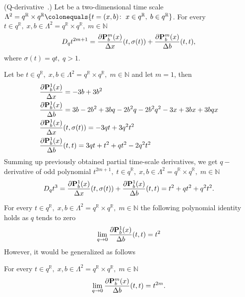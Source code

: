 \begin{cor}
    \label{q_derivative_case}
    (Q-derivative~\cite{jackson_1909}.)
    Let be a two-dimensional time scale
    $\Lambda^2 = q^{\mathbb{R}} \times q^{\mathbb{R}} \colonequals \{t=(x,b) \colon \; x\in q^{\mathbb{R}}, \; b \in q^{\mathbb{R}} \}$.
    For every $t\in q^{\mathbb{R}}, \; x,b\in \Lambda^2 = q^{\mathbb{R}} \times q^{\mathbb{R}}, \; m\in\mathbb{N}$
    \[
        D_{q} t^{2m+1}
        = \frac{\partial {\mathbf{P}}\sp{m} \sb{b}(x)}{\Delta x}(t, \sigma(t))
        + \frac{\partial {\mathbf{P}}\sp{m} \sb{b}(x)}{\Delta b}(t, t),
    \]
    where $\sigma(t) = qt, \; q > 1$.
\end{cor}
\begin{examp}
    Let be $t\in q^{\mathbb{R}}, \; x,b\in \Lambda^2 = q^{\mathbb{R}} \times q^{\mathbb{R}}, \; m\in\mathbb{N}$
    and let $m=1$, then
    \begin{align*}
        &\frac{\partial {\mathbf{P}}\sp{1} \sb{b}(x)}{\Delta x} = -3 b + 3 b^2 \\
        &\frac{\partial {\mathbf{P}}\sp{1} \sb{b}(x)}{\Delta b} = 3 b - 2 b^2 + 3 b q - 2 b^2 q - 2 b^2 q^2 - 3 x + 3 b x + 3 b q x \\
        &\frac{\partial {\mathbf{P}}\sp{1} \sb{b}(x)}{\Delta x}(t, \sigma(t)) = -3 q t + 3 q^2 t^2 \\
        &\frac{\partial {\mathbf{P}}\sp{1} \sb{b}(x)}{\Delta b}(t, t) = 3 q t + t^2 + q t^2 - 2 q^2 t^2
    \end{align*}
    Summing up previously obtained partial time-scale derivatives, we get $q-$derivative of odd polynomial
    $t^{2m+1}, \; t\in q^{\mathbb{R}}, \; x,b\in \Lambda^2 = q^{\mathbb{R}} \times q^{\mathbb{R}}, \; m\in\mathbb{N}$
    \[
        D_{q} t^{3}
        = \frac{\partial {\mathbf{P}}\sp{1} \sb{b}(x)}{\Delta x}(t, \sigma(t)) + \frac{\partial {\mathbf{P}}\sp{1} \sb{b}(x)}{\Delta b}(t, t)
        = t^2 + q t^2 + q^2 t^2.
    \]
\end{examp}
For every $t\in q^{\mathbb{R}}, \; x,b\in \Lambda^2 = q^{\mathbb{R}} \times q^{\mathbb{R}}, \; m\in\mathbb{N}$
the following polynomial identity holds as $q$ tends to zero
\[
    \lim \limits_{q \to 0} \frac{\partial {\mathbf{P}}\sp{1} \sb{b}(x)}{\Delta b}(t, t) = t^2
\]
However, it would be generalized as follows
\begin{cor}
    For every $t\in q^{\mathbb{R}}, \; x,b\in \Lambda^2 = q^{\mathbb{R}} \times q^{\mathbb{R}}, \; m\in\mathbb{N}$
    \[
        \lim \limits_{q \to 0} \frac{\partial {\mathbf{P}}\sp{m} \sb{b}(x)}{\Delta b}(t, t) = t^{2m}.
    \]
\end{cor}
